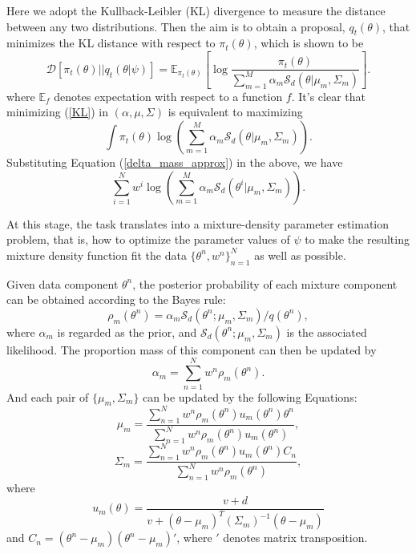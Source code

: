 Here we adopt the Kullback-Leibler (KL) divergence to measure the
distance between any two distributions. Then the aim is to obtain a
proposal, $q_t(\theta)$, that minimizes the KL distance with respect
to $\pi_t(\theta)$, which is shown to be
\begin{equation}\label{KL}
\mathcal{D}[\pi_t(\theta)||q_t(\theta|\psi)]=\mathbb{E}_{\pi_t(\theta)}\left[\log\frac{\pi_t(\theta)}{\sum\limits_{m=1}^M
\alpha_m\mathcal{S}_d(\theta|\mu_m,\Sigma_m)}\right].
\end{equation}
where $\mathbb{E}_f$ denotes expectation with respect to a function
$f$. It's clear that minimizing (\ref{KL}) in $(\alpha,\mu,\Sigma)$
is equivalent to maximizing
\begin{equation}\label{MLE}
\int\pi_t(\theta)\log\left(\sum\limits_{m=1}^M
\alpha_m\mathcal{S}_d(\theta|\mu_m,\Sigma_m)\right).
\end{equation}
Substituting Equation (\ref{delta_mass_approx}) in the above, we
have
\begin{equation}\label{Max_log_lik}
\sum_{i=1}^N w^i\log\left(\sum\limits_{m=1}^M
\alpha_m\mathcal{S}_d(\theta^i|\mu_m,\Sigma_m)\right).
\end{equation}

At this stage, the task translates into a mixture-density parameter
estimation problem, that is, how to optimize the parameter values of
$\psi$ to make the resulting mixture density function fit the data
$\{\theta^n,w^n\}_{n=1}^N$ as well as possible.

Given data component $\theta^n$, the posterior probability of each
mixture component can be obtained according to the Bayes rule:
\begin{equation}\label{posterior_prob_component}
\rho_m(\theta^n)=\alpha_m
\mathcal{S}_d(\theta^n;\mu_m,\Sigma_m)/q(\theta^n),
\end{equation}
where $\alpha_m$ is regarded as the prior, and
$\mathcal{S}_d(\theta^n;\mu_m,\Sigma_m)$ is the associated
likelihood. The proportion mass of this component can then be
updated by
\begin{equation}\label{MLE_alpha}
\alpha_m=\sum\limits_{n=1}^N w^n \rho_m(\theta^n).
\end{equation}
And each pair of $\{\mu_m,\Sigma_m\}$ can be updated by the
following Equations:
\begin{equation}
\mu_m=\frac{\sum\limits_{n=1}^N w^n
\rho_m(\theta^n)u_m(\theta^n)\theta^n}{\sum\limits_{n=1}^N w^n
\rho_m(\theta^n)u_m(\theta^n)},
\end{equation}
\begin{equation}\label{MLE_Sigma}
\Sigma_m=\frac{\sum\limits_{n=1}^N w^n
\rho_m(\theta^n)u_m(\theta^n)C_n }{\sum\limits_{n=1}^N w^n
\rho_m(\theta^n)},
\end{equation}
where
\begin{equation}
u_m(\theta)=\frac{v+d}{v+(\theta-\mu_m)^T(\Sigma_m)^{-1}(\theta-\mu_m)}
\end{equation}
and $C_n=(\theta^n-\mu_m)(\theta^n-\mu_m)'$, where $'$ denotes
matrix transposition.

